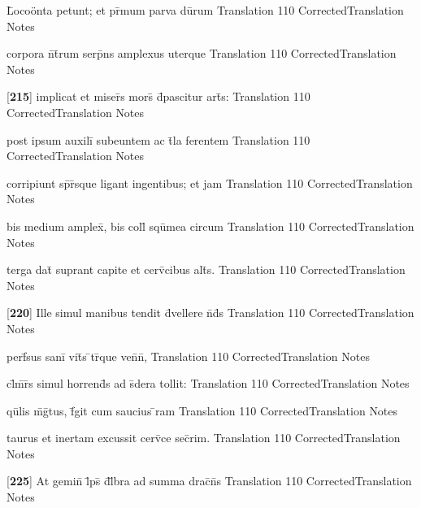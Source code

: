 \latline
  {L\={}oco\"{o}nta petunt; et pr\={\macron {\i}}mum parva du\={}rum}
  { Translation }
  {110}
  { CorrectedTranslation }
  { Notes }


\latline
  {corpora n\={}t\={}rum serp\={}ns amplexus uterque}
  { Translation }
  {110}
  { CorrectedTranslation }
  { Notes }


\latline
  {[\textbf{215}] implicat et miser\={}s mors\={} d\={}pascitur art\={}s:}
  { Translation }
  {110}
  { CorrectedTranslation }
  { Notes }


\latline
  {post ipsum auxili\={} subeuntem ac t\={}la ferentem}
  { Translation }
  {110}
  { CorrectedTranslation }
  { Notes }


\latline
  {corripiunt sp\={\macron {\i}}r\={\macron {\i}}sque ligant ingentibus; et jam}
  { Translation }
  {110}
  { CorrectedTranslation }
  { Notes }


\latline
  {bis medium amplex\={\macron {\i}}, bis coll\={} squ\={}mea circum}
  { Translation }
  {110}
  { CorrectedTranslation }
  { Notes }


\latline
  {terga dat\={\macron {\i}} suprant capite et cerv\={\macron {\i}}cibus alt\={\macron {\i}}s.}
  { Translation }
  {110}
  { CorrectedTranslation }
  { Notes }


\latline
  {[\textbf{220}] Ille simul manibus tendit d\={\macron {\i}}vellere n\={}d\={}s}
  { Translation }
  {110}
  { CorrectedTranslation }
  { Notes }


\latline
  {perf\={}sus sani\={} vit\={}s \={}tr\={}que ven\={}n\={},}
  { Translation }
  {110}
  { CorrectedTranslation }
  { Notes }


\latline
  {cl\={}m\={}r\={}s simul horrend\={}s ad s\={\macron {\i}}dera tollit:}
  { Translation }
  {110}
  { CorrectedTranslation }
  { Notes }


\latline
  {qu\={}lis m\={}g\={\macron {\i}}tus, f\={}git cum saucius \={}ram}
  { Translation }
  {110}
  { CorrectedTranslation }
  { Notes }


\latline
  {taurus et inertam excussit cerv\={\macron {\i}}ce sec\={}rim.}
  { Translation }
  {110}
  { CorrectedTranslation }
  { Notes }


\latline
  {[\textbf{225}] At gemin\={\macron {\i}} l\={}ps\={} d\={}l\={}bra ad summa drac\={}n\={}s}
  { Translation }
  {110}
  { CorrectedTranslation }
  { Notes }


